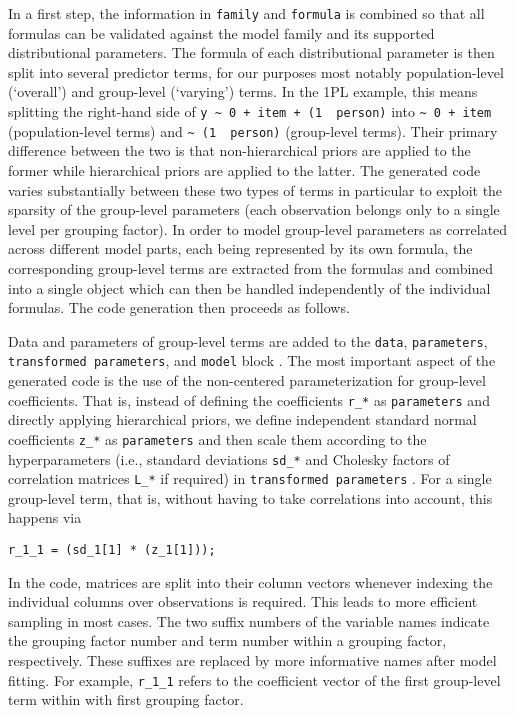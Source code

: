 \documentclass[
]{jss}
\begin{document}
In a first step, the information in \texttt{family} and \texttt{formula}
is combined so that all  formulas can be validated against
the model family and its supported distributional parameters. The
formula of each distributional parameter is then split into several
predictor terms, for our purposes most notably population-level
(`overall') and group-level (`varying') terms. In the 1PL example, this
means splitting the right-hand side of
\texttt{y\ \textasciitilde{}\ 0\ +\ item\ +\ (1\ \textbar{}\ person)}
into \texttt{\textasciitilde{}\ 0\ +\ item} (population-level terms) and
\texttt{\textasciitilde{}\ (1\ \textbar{}\ person)} (group-level terms).
Their primary difference between the two is that non-hierarchical priors
are applied to the former while hierarchical priors are applied to the
latter. The generated  code varies substantially between
these two types of terms in particular to exploit the sparsity of the
group-level parameters (each observation belongs only to a single level
per grouping factor). In order to model group-level parameters as
correlated across different model parts, each being represented by its
own formula, the corresponding group-level terms are extracted from the
formulas and combined into a single object which can then be handled
independently of the individual formulas. The  code
generation then proceeds as follows.

Data and parameters of group-level terms are added to the \texttt{data},
\texttt{parameters}, \texttt{transformed\ parameters}, and
\texttt{model} block \citep[see][ for more details on 
programming blocks]{carpenter2017}. The most important aspect of the
generated  code is the use of the non-centered
parameterization for group-level coefficients. That is, instead of
defining the coefficients \texttt{r\_*} as \texttt{parameters} and
directly applying hierarchical priors, we define independent standard
normal coefficients \texttt{z\_*} as \texttt{parameters} and then scale
them according to the hyperparameters (i.e., standard deviations
\texttt{sd\_*} and Cholesky factors of correlation matrices
\texttt{L\_*} if required) in \texttt{transformed\ parameters} . For a
single group-level term, that is, without having to take correlations
into account, this happens via

\begin{verbatim}
r_1_1 = (sd_1[1] * (z_1[1]));
\end{verbatim}

In the  code, matrices are split into their column
vectors whenever indexing the individual columns over observations is
required. This leads to more efficient sampling in most cases. The two
suffix numbers of the variable names indicate the grouping factor number
and term number within a grouping factor, respectively. These suffixes
are replaced by more informative names after model fitting. For example,
\texttt{r\_1\_1} refers to the coefficient vector of the first
group-level term within with first grouping factor.
\end{document}
